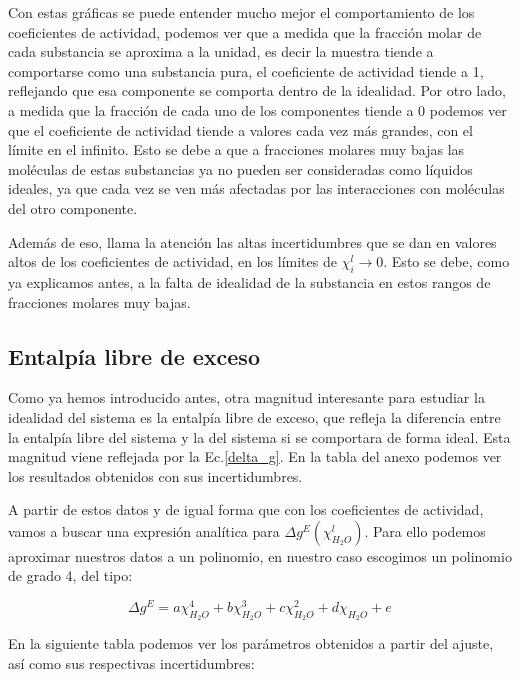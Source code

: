 \documentclass[a4paper,12pt,titlepage]{article}
\begin{document}
Con estas gráficas se puede entender mucho mejor el comportamiento de los coeficientes de actividad, podemos ver que a medida que la fracción molar de cada substancia se aproxima a la unidad, es decir la muestra tiende a comportarse como una substancia pura, el coeficiente de actividad tiende a 1, reflejando que esa componente se comporta dentro de la idealidad. Por otro lado, a medida que la fracción de cada uno de los componentes tiende a 0 podemos ver que el coeficiente de actividad tiende a valores cada vez más grandes, con el límite en el infinito. Esto se debe a que a fracciones molares muy bajas las moléculas de estas substancias ya no pueden ser consideradas como líquidos ideales, ya que cada vez se ven más afectadas por las interacciones con moléculas del otro componente.

Además de eso, llama la atención las altas incertidumbres que se dan en valores altos de los coeficientes de actividad, en los límites de $\chi_i^l \to 0$. Esto se debe, como ya explicamos antes, a la falta de idealidad de la substancia en estos rangos de fracciones molares muy bajas.

\newpage

\subsection{Entalpía libre de exceso}

Como ya hemos introducido antes, otra magnitud interesante para estudiar la idealidad del sistema es la entalpía libre de exceso, que refleja la diferencia entre la entalpía libre del sistema y la del sistema si se comportara de forma ideal. Esta magnitud viene reflejada por la Ec.\ref{delta_g}. En la tabla del anexo podemos ver los resultados obtenidos con sus incertidumbres.

A partir de estos datos y de igual forma que con los coeficientes de actividad, vamos a buscar una expresión analítica para $\Delta g^{E}(\chi_{H_2O}^l)$. Para ello podemos aproximar nuestros datos a un polinomio, en nuestro caso escogimos un polinomio de grado 4, del tipo:

\begin{equation}
    \Delta g^{E} = a\chi_{H_2O}^4 + b\chi_{H_2O}^3 + c\chi_{H_2O}^2 + d\chi_{H_2O} + e
\end{equation}

En la siguiente tabla podemos ver los parámetros obtenidos a partir del ajuste, así como sus respectivas incertidumbres:
\end{document}
